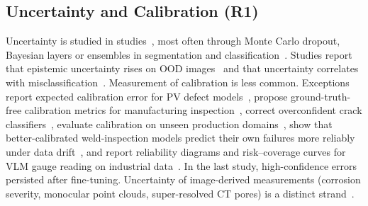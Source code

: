 \documentclass[journal]{IEEEtran}
\begin{document}
\subsection{Uncertainty and Calibration (R1)}
Uncertainty is studied in \nAnyOne{} studies~\citeOne, most often through Monte Carlo dropout, Bayesian layers or ensembles in segmentation and classification~\cite{nash2022deep,kang2019contact,sajedi2020model,liang2020deep,thakur2024deep}. Studies report that epistemic uncertainty rises on OOD images~\cite{nash2022deep} and that uncertainty correlates with misclassification~\cite{sajedi2020model}. Measurement of calibration is less common. Exceptions report expected calibration error for PV defect models~\cite{khandagale2026dasformer}, propose ground-truth-free calibration metrics for manufacturing inspection~\cite{rozanec2023active}, correct overconfident crack classifiers~\cite{chen2025attack}, evaluate calibration on unseen production domains~\cite{bence2026yolov}, show that better-calibrated weld-inspection models predict their own failures more reliably under data drift~\cite{bauer2025handling}, and report reliability diagrams and risk--coverage curves for VLM gauge reading on industrial data~\cite{mueez2026vision}. In the last study, high-confidence errors persisted after fine-tuning. Uncertainty of image-derived measurements (corrosion severity, monocular point clouds, super-resolved CT pores) is a distinct strand~\cite{rintrawong2026coverage,malihi2026quantitative,klos2025super}.
\end{document}

